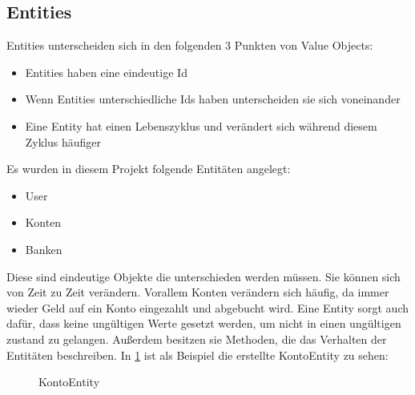 \subsection{Entities}
Entities unterscheiden sich in den folgenden 3 Punkten von Value Objects:
\begin{itemize}
    \item Entities haben eine eindeutige Id
    \item Wenn Entities unterschiedliche Ids haben unterscheiden sie sich voneinander
    \item Eine Entity hat einen Lebenszyklus und verändert sich während diesem Zyklus häufiger
\end{itemize}
Es wurden in diesem Projekt folgende Entitäten angelegt:
\begin{itemize}
    \item User
    \item Konten
    \item Banken
\end{itemize}
Diese sind eindeutige Objekte die unterschieden werden müssen. Sie können sich von Zeit zu Zeit verändern. Vorallem Konten verändern sich häufig, da immer wieder Geld auf ein Konto 
eingezahlt und abgebucht wird. 
\newline Eine Entity sorgt auch dafür, dass keine ungültigen Werte gesetzt werden, um nicht in einen ungültigen zustand zu gelangen. Außerdem besitzen sie Methoden, die das Verhalten der 
Entitäten beschreiben.
\newline In \ref{kontoEntity} ist als Beispiel die erstellte KontoEntity zu sehen:
\begin{figure}[htbp]
    \centering
    \caption{\label{kontoEntity} KontoEntity}
\end{figure}
